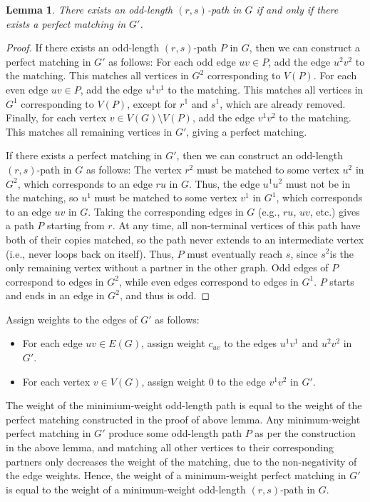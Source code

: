 \documentclass[11pt,letterpaper]{article}
\newtheorem{lemma}[theorem]{Lemma}
\theoremstyle{definition}
\begin{document}
\begin{lemma}
    There exists an odd-length $(r,s)$-path in $G$ if and only if there exists a perfect matching in $G'$.
\end{lemma}
\begin{proof}
    If there exists an odd-length $(r,s)$-path $P$ in $G$, then we can construct a perfect matching in $G'$ as follows:
    For each odd edge $uv\in P$, add the edge $u^2v^2$ to the matching. This matches all vertices in $G^2$ corresponding to $V(P)$.
    For each even edge $uv\in P$, add the edge $u^1v^1$ to the matching. This matches all vertices in $G^1$ corresponding to $V(P)$, except for $r^1$ and $s^1$, which are already removed.
    Finally, for each vertex $v\in V(G)\setminus V(P)$, add the edge $v^1v^2$ to the matching. This matches all remaining vertices in $G'$, giving a perfect matching.

    If there exists a perfect matching in $G'$, then we can construct an odd-length $(r,s)$-path in $G$ as follows:
    The vertex $r^2$ must be matched to some vertex $u^2$ in $G^2$, which corresponds to an edge $ru$ in $G$.
    Thus, the edge $u^1u^2$ must not be in the matching, so $u^1$ must be matched to some vertex $v^1$ in $G^1$, which corresponds to an edge $uv$ in $G$.
    Taking the corresponding edges in $G$ (e.g., $ru$, $uv$, etc.) gives a path $P$ starting from $r$.
    At any time, all non-terminal vertices of this path have both of their copies matched, so the path never extends to an intermediate vertex (i.e., never loops back on itself).
    Thus, $P$ must eventually reach $s$, since $s^2$is the only remaining vertex without a partner in the other graph.
    Odd edges of $P$ correspond to edges in $G^2$, while even edges correspond to edges in $G^1$.
    $P$ starts and ends in an edge in $G^2$, and thus is odd.
\end{proof}

Assign weights to the edges of $G'$ as follows:
\begin{itemize}
    \item For each edge $uv\in E(G)$, assign weight $c_{uv}$ to the edges $u^1v^1$ and $u^2v^2$ in $G'$.
    \item For each vertex $v\in V(G)$, assign weight $0$ to the edge $v^1v^2$ in $G'$.
\end{itemize}
The weight of the minimium-weight odd-length path is equal to the weight of the perfect matching constructed in the proof of above lemma.
Any minimum-weight perfect matching in $G'$ produce some odd-length path $P$ as per the construction in the above lemma, and matching all other vertices to their corresponding partners only decreases the weight of the matching, due to the non-negativity of the edge weights.
Hence, the weight of a minimum-weight perfect matching in $G'$ is equal to the weight of a minimum-weight odd-length $(r,s)$-path in $G$.
\end{document}
